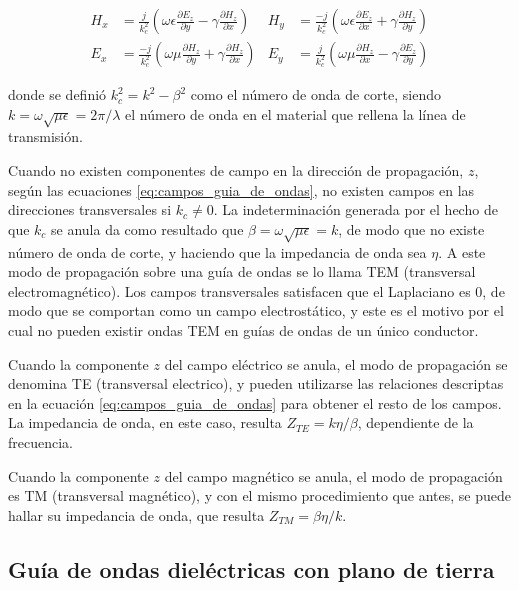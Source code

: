 \begin{equation}
	\begin{aligned}
		H_x &= \frac{j}{k_c^2} \left(\omega \epsilon \frac{\partial E_z}{\partial y} - \gamma \frac{\partial H_z}{\partial x} \right) & H_y &= \frac{-j}{k_c^2} \left(\omega \epsilon \frac{\partial E_z}{\partial x} + \gamma \frac{\partial H_z}{\partial y} \right)\\
		E_x &= \frac{-j}{k_c^2} \left(\omega \mu \frac{\partial H_z}{\partial y} + \gamma \frac{\partial H_z}{\partial x} \right) & E_y &= \frac{j}{k_c^2} \left(\omega \mu \frac{\partial H_z}{\partial x} - \gamma \frac{\partial E_z}{\partial y} \right)
	\end{aligned}
	\label{eq:campos_guia_de_ondas}
\end{equation}

donde se definió $k_c^2 = k^2 - \beta^2$ como el número de onda de corte, siendo $k = \omega \sqrt{\mu \epsilon} = 2\pi/\lambda$ el número de onda  en el material que rellena la línea de transmisión.

Cuando no existen componentes de campo en la dirección de propagación, $z$, según las ecuaciones \ref{eq:campos_guia_de_ondas}, no existen campos en las direcciones transversales si $k_c \neq 0$. La indeterminación generada por el hecho de que $k_c$ se anula da como resultado que $\beta = \omega \sqrt{\mu \epsilon} = k$, de modo que no existe número de onda de corte, y haciendo que la impedancia de onda sea $\eta$.  A este modo de propagación sobre una guía de ondas se lo llama TEM (transversal electromagnético). Los campos transversales satisfacen que el Laplaciano es 0, de modo que se comportan como un campo electrostático, y este es el motivo por el cual no pueden existir ondas TEM en guías de ondas de un único conductor.

Cuando la componente $z$ del campo eléctrico se anula, el modo de propagación se denomina TE (transversal electrico), y pueden utilizarse las relaciones descriptas en la ecuación \ref{eq:campos_guia_de_ondas} para obtener el resto de los campos. La impedancia de onda, en este caso, resulta $Z_{TE} = k\eta/\beta$, dependiente de la frecuencia.

Cuando la componente $z$ del campo magnético se anula, el modo de propagación es TM (transversal magnético), y con el mismo procedimiento que antes, se puede hallar su impedancia de onda, que resulta $Z_{TM} = \beta \eta / k$.

\subsection{Guía de ondas dieléctricas con plano de tierra}

